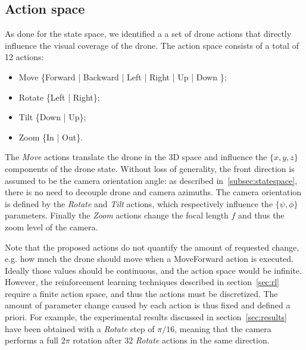 \documentclass{article}
\begin{document}
\subsection{Action space}
\label{subsec:actionspace}
As done for the state space, we identified a a set of drone actions that directly influence the visual coverage of the drone. The action space consists of a total of 12 actions:
\begin{itemize}
	\item Move \{Forward | Backward | Left | Right | Up | Down \};
	\item Rotate \{Left | Right\};
	\item Tilt \{Down | Up\};
	\item Zoom \{In | Out\}.
\end{itemize}

The \emph{Move} actions translate the drone in the 3D space and influence the $\{x,y,z\}$ components of the drone state. Without loss of generality, the front direction is assumed to be the camera orientation angle: as described in~\ref{subsec:statespace}, there is no need to decouple drone and camera azimuths. The camera orientation is defined by the \emph{Rotate} and \emph{Tilt} actions, which respectively influence the $\{\psi, \phi\}$ parameters. Finally the \emph{Zoom} actions change the focal length $f$ and thus the zoom level of the camera.

Note that the proposed actions do not quantify the amount of requested change, e.g. how much the drone should move when a MoveForward action is executed. Ideally those values should be continuous, and the action space would be infinite. However, the reinforcement learning techniques described in section~\ref{sec:rl} require a finite action space, and thus the actions must be discretized. The amount of parameter change caused by each action is thus fixed and defined a priori. For example, the experimental results discussed in section~\ref{sec:results} have been obtained with a \emph{Rotate} step of $\pi/16$, meaning that the camera performs a full $2\pi$ rotation after 32 \emph{Rotate} actions in the same direction.
\end{document}
